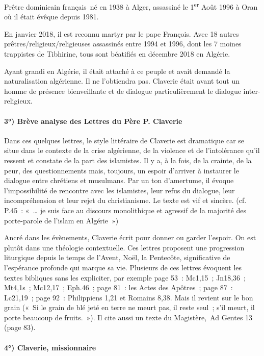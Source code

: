 Prêtre dominicain français né en 1938 à Alger, assassiné le 1\textsuperscript{er} Août 1996 à Oran où il était évêque depuis 1981. 

En janvier 2018, il est reconnu martyr par le pape François. Avec 18 autres prêtres/religieux/religieuses assassinés entre 1994 et 1996, dont les 7 moines trappistes de Tibhirine, tous sont béatifiés en décembre 2018 en Algérie. 

Ayant grandi en Algérie, il était attaché à ce peuple et avait demandé la naturalisation algérienne. Il ne l’obtiendra pas. Claverie était avant tout un homme de présence bienveillante et de dialogue particulièrement le dialogue inter-religieux.

\paragraph{ 3°) Brève analyse des Lettres du Père P. Claverie }

Dans ces quelques lettres, le style littéraire de Claverie est dramatique car se situe dans le contexte de la crise algérienne, de la violence et de l’intolérance qu’il ressent et constate de la part des islamistes. Il y a, à la fois, de la crainte, de la peur, des questionnements mais, toujours, un espoir d’arriver à instaurer le dialogue entre chrétiens et musulmans. Par un ton d’amertume, il évoque l’impossibilité de rencontre avec les islamistes, leur refus du dialogue, leur incompréhension et leur rejet du christianisme. Le texte est vif et sincère. (cf. P.45 : « … je suis face au discours monolithique et agressif de la majorité des porte-parole de l’islam en Algérie ») 

Ancré dans les évènements, Claverie écrit pour donner ou garder l’espoir. On est plutôt dans une théologie contextuelle. Ces lettres proposent une progression liturgique depuis le temps de l’Avent, Noël, la Pentecôte, significative de l’espérance profonde qui marque sa vie. Plusieurs de ces lettres évoquent les textes bibliques sans les expliciter, par exemple page 53 : Mc1,15 ; Jn18,36 ; Mt4,1s ; Mc12,17 ; Eph.46 ; page 81 : les Actes des Apôtres ; page 87 : Lc21,19 ; page 92 : Philippiens 1,21 et Romains 8,38. Mais il revient sur le bon grain (« Si le grain de blé jeté en terre ne meurt pas, il reste seul ; s’il meurt, il porte beaucoup de fruits. »). Il cite aussi un texte du Magistère, Ad Gentes 13 (page 83). 

\paragraph{4°) Claverie, missionnaire}
 


